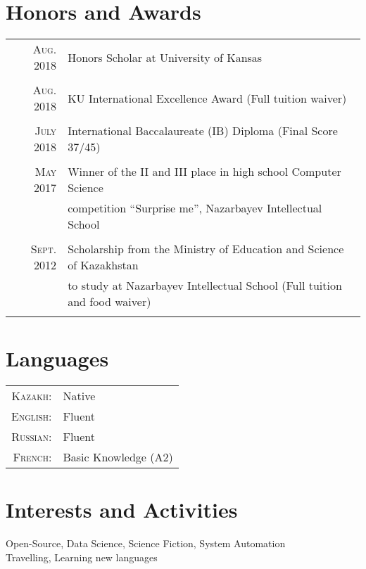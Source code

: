 \documentclass[a4paper,10pt]{article}
\begin{document}
\section{Honors and Awards}
\begin{tabular}{rl}
  
  \textsc{Aug.} 2018 & Honors Scholar at University of Kansas\\\\

  \textsc{Aug.} 2018 & KU International Excellence Award \footnotesize{(Full tuition waiver)}\\\\

  \textsc{July} 2018 & International Baccalaureate (IB) Diploma \footnotesize(Final Score 37/45)\\\\

  \textsc{May} 2017 & Winner of the II and III place in high school Computer Science \\&competition “Surprise me”, Nazarbayev Intellectual School\\\\

  \textsc{Sept.} 2012 & Scholarship from the Ministry of Education and Science of Kazakhstan\\&to study at Nazarbayev Intellectual School \footnotesize(Full tuition and food waiver)\normalsize\\\\

\end{tabular}

\section{Languages}
\begin{tabular}{rl}
 \textsc{Kazakh:}&Native\\
 \textsc{English:}&Fluent\\
 \textsc{Russian:}&Fluent\\
 \textsc{French:}&Basic Knowledge (A2)\\
\end{tabular}

\section{Interests and Activities}
Open-Source, Data Science, Science Fiction, System Automation\\
Travelling, Learning new languages
\end{document}
